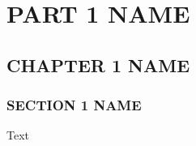 \documentclass[11pt]{report} %
\begin{document}
\clearpage
{} %

\part{PART 1 NAME}

\chapter{CHAPTER 1 NAME}\label{ch:1}

\section{SECTION 1 NAME}

Text



\clearpage
{}
\printbibliography



\end{document}
